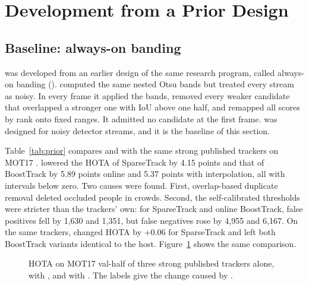 \section{Development from a Prior Design}\label{sec:development}

\subsection{Baseline: always-on banding}\label{sec:prior}
\scl{} was developed from an earlier design of the same research program,
called always-on banding (\aob{}). \aob{} computed the same nested Otsu bands
but treated every stream as noisy. In every frame it applied the bands,
removed every weaker candidate that overlapped a stronger one with IoU above
one half, and remapped all scores by rank onto fixed ranges. It admitted no
candidate at the first frame. \aob{} was designed for noisy detector streams,
and it is the baseline of this section.

Table~\ref{tab:prior} compares \aob{} and \scl{} with the same strong published
trackers on MOT17 \cite{milan2016mot16}. \aob{} lowered the HOTA of
SparseTrack by 4.15 points and that of BoostTrack by 5.89 points online and
5.37 points with interpolation, all with intervals below zero. Two causes were
found. First, overlap-based duplicate removal deleted occluded people in
crowds. Second, the self-calibrated thresholds were stricter than the
trackers' own: for SparseTrack and online BoostTrack, false positives fell by
1,630 and 1,351, but false negatives rose by 4,955 and 6,167. On the same
trackers, \scl{} changed HOTA by $+0.06$ for SparseTrack and left both
BoostTrack variants identical to the host. Figure~\ref{fig:prior} shows the
same comparison.



\begin{figure}[t]
\centering

\caption{HOTA on MOT17 val-half of three strong published trackers alone, with
\aob{}, and with \scl{}. The labels give the change caused by \aob{}.}
\label{fig:prior}
\end{figure}


